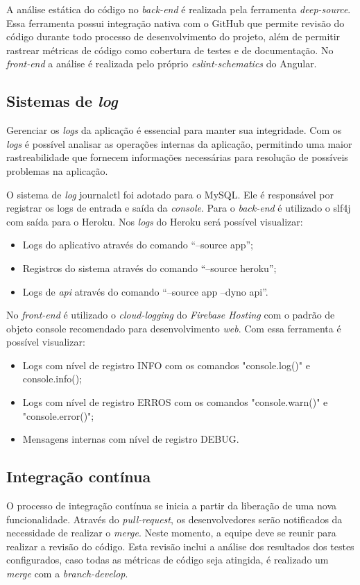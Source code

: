 A análise estática do código no \textit{\gls{back-end}} é realizada pela ferramenta \textit{\gls{deep-source}}. Essa ferramenta possui integração nativa com o GitHub que permite revisão do código durante todo processo de desenvolvimento do projeto, além de permitir rastrear métricas de código como cobertura de testes e de documentação. No \textit{\gls{front-end}} a análise é realizada pelo próprio \textit{\gls{eslint-schematics}} do Angular.


\subsection{Sistemas de \textit{log}}
Gerenciar os \textit{\glspl{log}} da aplicação é essencial para manter sua integridade. Com os \textit{\glspl{log}} é possível analisar as operações internas da aplicação, permitindo uma maior rastreabilidade que fornecem informações necessárias para resolução de possíveis problemas na aplicação.


O sistema de \textit{\gls{log}} \gls{journalctl} foi adotado para o MySQL. Ele é responsável por registrar os logs de entrada e saída da \textit{console}. 
Para o \textit{\gls{back-end}} é utilizado o \ac{slf4j} com saída para o Heroku.  Nos \textit{\glspl{log}}  do Heroku será possível visualizar: 
\begin{itemize}
\item Logs do aplicativo através do comando “--source app”;
\item Registros do sistema através do comando “--source heroku”;
\item Logs de \textit{\ac{api}} através do comando “--source app --dyno api”.
\end{itemize}


No \textit{front-end} é utilizado o \textit{\gls{cloud-logging}} do \textit{Firebase Hosting} com o padrão de objeto console recomendado para desenvolvimento \textit{web}. Com essa ferramenta é possível visualizar:
\begin{itemize}
\item Logs com nível de registro INFO com os comandos "console.log()" e console.info();
\item Logs com nível de registro ERROS com os comandos "console.warn()" e "console.error()";
\item Mensagens internas com nível de registro DEBUG.
\end{itemize}

\subsection{Integração contínua}
O processo de integração contínua se inicia a partir da liberação de uma nova funcionalidade. Através do \textit{\gls{pull-request}}, os desenvolvedores serão notificados da necessidade de realizar o \textit{\gls{merge}}. Neste momento, a equipe deve se reunir para realizar a revisão do código. Esta revisão inclui a análise dos resultados dos testes configurados, caso todas as métricas de código seja atingida, é realizado um \textit{\gls{merge}} com a \textit{\gls{branch-develop}}. 


